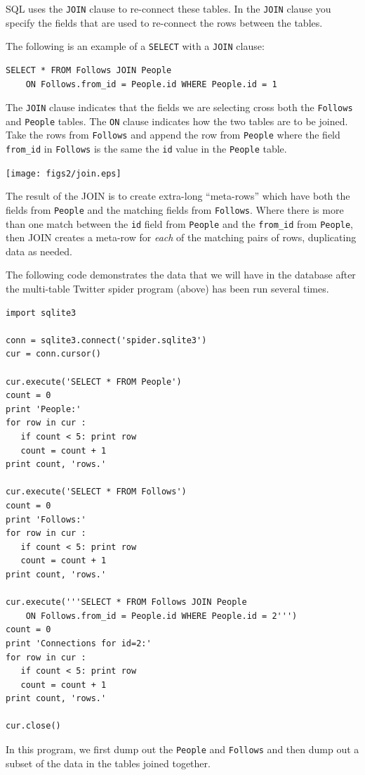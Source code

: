 SQL uses the {\tt JOIN} clause to re-connect these tables.  
In the {\tt JOIN} clause you specify the fields that are used 
to re-connect the rows between the tables.

The following is an example of a {\tt SELECT} with a 
{\tt JOIN} clause:

\beforeverb
\begin{verbatim}
SELECT * FROM Follows JOIN People 
    ON Follows.from_id = People.id WHERE People.id = 1
\end{verbatim}
\afterverb
%
The {\tt JOIN} clause indicates that the fields we are selecting
cross both the {\tt Follows} and {\tt People} tables.  The {\tt ON}
clause indicates how the two tables are to be joined.   Take the rows
from {\tt Follows} and append the row from {\tt People} where the
field \verb"from_id" in {\tt Follows} is the same the {\tt id} value
in the {\tt People} table.

\beforefig
\centerline{\texttt{[image: figs2/join.eps]}}
\afterfig

The result of the JOIN is to create extra-long ``meta-rows'' which have both 
the fields from {\tt People} and the matching fields from {\tt Follows}.
Where there is more than one match between the {\tt id} field from {\tt People}
and the \verb"from_id" from {\tt People}, then JOIN creates a meta-row 
for \emph{each} of the matching pairs of rows, duplicating data as needed.

The following code demonstrates the data that we will have in the 
database after the multi-table Twitter spider program (above) has
been run several times.

\beforeverb
\begin{verbatim}
import sqlite3

conn = sqlite3.connect('spider.sqlite3')
cur = conn.cursor()

cur.execute('SELECT * FROM People')
count = 0
print 'People:'
for row in cur :
   if count < 5: print row
   count = count + 1
print count, 'rows.'

cur.execute('SELECT * FROM Follows')
count = 0
print 'Follows:'
for row in cur :
   if count < 5: print row
   count = count + 1
print count, 'rows.'

cur.execute('''SELECT * FROM Follows JOIN People 
    ON Follows.from_id = People.id WHERE People.id = 2''')
count = 0
print 'Connections for id=2:'
for row in cur :
   if count < 5: print row
   count = count + 1
print count, 'rows.'

cur.close()
\end{verbatim}
\afterverb
%
In this program, we first dump out the {\tt People}
and {\tt Follows} and then dump out a subset of the
data in the tables joined together.

